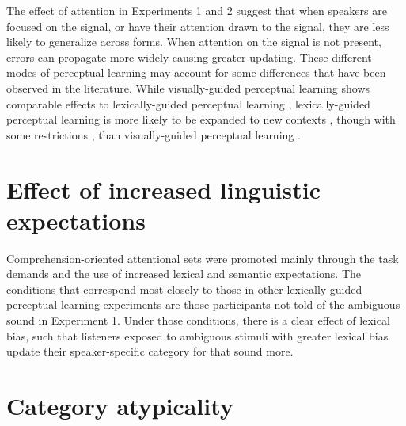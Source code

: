 The effect of attention in Experiments 1 and 2 suggest that when speakers are focused on the signal, or have their attention drawn to the signal, they are less likely to generalize across forms.
When attention on the signal is not present, errors can propagate more widely causing greater updating.
These different modes of perceptual learning may account for some differences that have been observed in the literature.
While visually-guided perceptual learning shows comparable effects to lexically-guided perceptual learning \citep{vanLinden2007}, lexically-guided perceptual learning is more likely to be expanded to new contexts \citep{Norris2003, Kraljic2008a}, though with some restrictions \citep{Mitterer2013}, than visually-guided perceptual learning \citep{Reinisch2014}.

\section{Effect of increased linguistic expectations}

Comprehension-oriented attentional sets were promoted mainly through the task demands and the use of increased lexical and semantic expectations.
The conditions that correspond most closely to those in other lexically-guided perceptual learning experiments \citep{Norris2003, Kraljic2005} are those participants not told of the ambiguous sound in Experiment 1.
Under those conditions, there is a clear effect of lexical bias, such that listeners exposed to ambiguous stimuli with greater lexical bias update their speaker-specific category for that sound more.

\section{Category atypicality}

